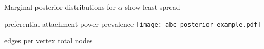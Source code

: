 \begin{frame}{Marginal posterior distributions for $\alpha$ show least spread}
  \begin{minipage}[p][\textheight][t]{\textwidth}
    \begin{center}
    preferential attachment power \hfill prevalence
      \texttt{[image: abc-posterior-example.pdf]}

      \vspace{-0.25cm}
      edges per vertex \hfill total nodes
    \end{center}
  \end{minipage}
\end{frame}
